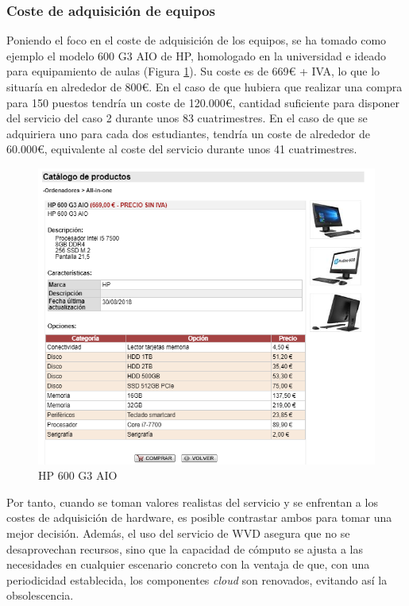 \clearpage

\subsubsection{Coste de adquisición de equipos}
Poniendo el foco en el coste de adquisición de los equipos, se ha tomado como ejemplo el modelo 600 G3 \acf{AIO} de HP, homologado en la universidad e ideado para equipamiento de aulas (Figura \ref{fig:hp_aio}). Su coste es de 669\euro{} + \acs{IVA}, lo que lo situaría en alrededor de 800\euro{}. En el caso de que hubiera que realizar una compra para 150 puestos tendría un coste de 120.000\euro{}, cantidad suficiente para disponer del servicio del caso 2 durante unos 83 cuatrimestres. En el caso de que se adquiriera uno para cada dos estudiantes, tendría un coste de alrededor de 60.000\euro{}, equivalente al coste del servicio durante unos 41 cuatrimestres.

\begin{figure}[h]
  \centering
  \includegraphics[width=0.8\linewidth]{figures/images/presupuesto/aio_hp.png}
  \caption{HP 600 G3 \acs{AIO}}
  \label{fig:hp_aio}
\end{figure}

Por tanto, cuando se toman valores realistas del servicio y se enfrentan a los costes de adquisición de hardware, es posible contrastar ambos para tomar una mejor decisión. Además, el uso del servicio de \acs{WVD} asegura que no se desaprovechan recursos, sino que la capacidad de cómputo se ajusta a las necesidades en cualquier escenario concreto con la ventaja de que, con una periodicidad establecida, los componentes \textit{cloud} son renovados, evitando así la obsolescencia.